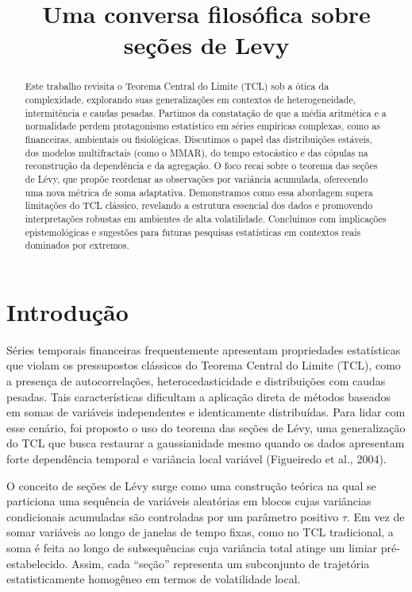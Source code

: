 \documentclass[
]{agujournal2019}
\begin{document}
\title{Uma conversa filosófica sobre seções de Levy}



\begin{abstract}
Este trabalho revisita o Teorema Central do Limite (TCL) sob a ótica da
complexidade, explorando suas generalizações em contextos de
heterogeneidade, intermitência e caudas pesadas. Partimos da constatação
de que a média aritmética e a normalidade perdem protagonismo
estatístico em séries empíricas complexas, como as financeiras,
ambientais ou fisiológicas. Discutimos o papel das distribuições
estáveis, dos modelos multifractais (como o MMAR), do tempo estocástico
e das cópulas na reconstrução da dependência e da agregação. O foco
recai sobre o teorema das seções de Lévy, que propõe reordenar as
observações por variância acumulada, oferecendo uma nova métrica de soma
adaptativa. Demonstramos como essa abordagem supera limitações do TCL
clássico, revelando a estrutura essencial dos dados e promovendo
interpretações robustas em ambientes de alta volatilidade. Concluímos
com implicações epistemológicas e sugestões para futuras pesquisas
estatísticas em contextos reais dominados por extremos.
\end{abstract}




\section{Introdução}\label{introduuxe7uxe3o}

Séries temporais financeiras frequentemente apresentam propriedades
estatísticas que violam os pressupostos clássicos do Teorema Central do
Limite (TCL), como a presença de autocorrelações, heterocedasticidade e
distribuições com caudas pesadas. Tais características dificultam a
aplicação direta de métodos baseados em somas de variáveis independentes
e identicamente distribuídas. Para lidar com esse cenário, foi proposto
o uso do teorema das seções de Lévy, uma generalização do TCL que busca
restaurar a gaussianidade mesmo quando os dados apresentam forte
dependência temporal e variância local variável (Figueiredo et al.,
2004).

O conceito de seções de Lévy surge como uma construção teórica na qual
se particiona uma sequência de variáveis aleatórias em blocos cujas
variâncias condicionais acumuladas são controladas por um parâmetro
positivo \(\tau\). Em vez de somar variáveis ao longo de janelas de
tempo fixas, como no TCL tradicional, a soma é feita ao longo de
subsequências cuja variância total atinge um limiar pré-estabelecido.
Assim, cada ``seção'' representa um subconjunto de trajetória
estatisticamente homogêneo em termos de volatilidade local.
\end{document}
